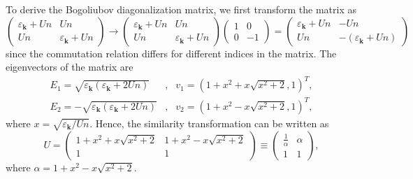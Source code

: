 \documentclass[aps,superscriptaddress,notitlepage,longbibliography]{revtex4-1}
\begin{document}
To derive the Bogoliubov diagonalization matrix, we first transform
the matrix as 
\begin{equation}
\left(\begin{array}{cc}
\varepsilon_{\bm{k}}+Un & Un\\
Un & \varepsilon_{\bm{k}}+Un
\end{array}\right)\rightarrow\left(\begin{array}{cc}
\varepsilon_{\bm{k}}+Un & Un\\
Un & \varepsilon_{\bm{k}}+Un
\end{array}\right)\left(\begin{array}{cc}
1 & 0\\
0 & -1
\end{array}\right)=\left(\begin{array}{cc}
\varepsilon_{\bm{k}}+Un & -Un\\
Un & -(\varepsilon_{\bm{k}}+Un)
\end{array}\right)
\end{equation}
since the commutation relation differs for different indices in the
matrix. The eigenvectors of the matrix are 
\begin{eqnarray}
E_{1}=\sqrt{\varepsilon_{\bm{k}}(\varepsilon_{\bm{k}}+2Un)} & , & v_{1}=\left(1+x^{2}+x\sqrt{x^{2}+2},1\right)^{T},\\
E_{2}=-\sqrt{\varepsilon_{\bm{k}}(\varepsilon_{\bm{k}}+2Un)} & , & v_{2}=\left(1+x^{2}-x\sqrt{x^{2}+2},1\right)^{T},
\end{eqnarray}
where $x=\sqrt{\varepsilon_{\bm{k}}/Un}$. Hence, the similarity transformation
can be written as 
\begin{equation}
U=\left(\begin{array}{cc}
1+x^{2}+x\sqrt{x^{2}+2} & 1+x^{2}-x\sqrt{x^{2}+2}\\
1 & 1
\end{array}\right)\equiv\left(\begin{array}{cc}
\frac{1}{\alpha} & \alpha\\
1 & 1
\end{array}\right),
\end{equation}
where $\alpha=1+x^{2}-x\sqrt{x^{2}+2}$.
\end{document}
